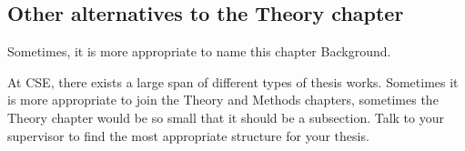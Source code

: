 \subsection{Other alternatives to the Theory chapter}
Sometimes, it is more appropriate to name this chapter Background.

At CSE, there exists a large span of different types of thesis works. Sometimes it is more appropriate to join the Theory and Methods chapters, sometimes the Theory chapter would be so small that it should be a subsection. Talk to your supervisor to find the most appropriate structure for your thesis.